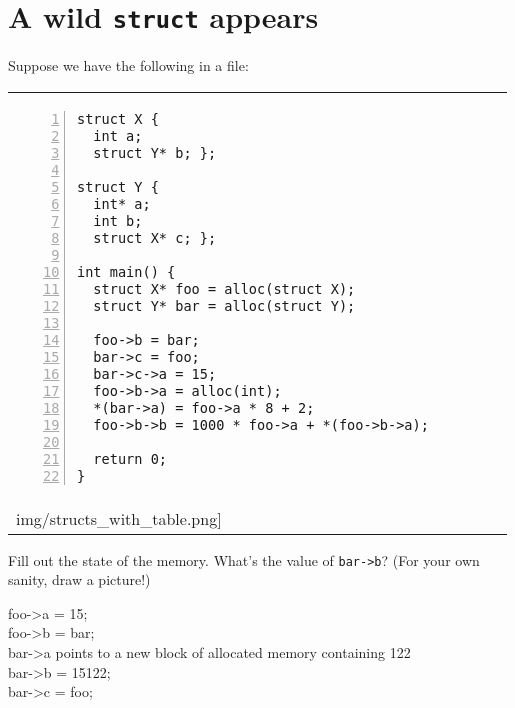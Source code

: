 \section*{A wild \lstinline'struct' appears%
}

Suppose we have the following in a file:

\begin{tabular}{l r}
    {\begin{lstlisting}[numbers=left]
struct X {
  int a;
  struct Y* b; };

struct Y {
  int* a;
  int b;
  struct X* c; };

int main() {
  struct X* foo = alloc(struct X);
  struct Y* bar = alloc(struct Y);

  foo->b = bar;
  bar->c = foo;
  bar->c->a = 15;
  foo->b->a = alloc(int);
  *(bar->a) = foo->a * 8 + 2;
  foo->b->b = 1000 * foo->a + *(foo->b->a);

  return 0;
}
    \end{lstlisting}}
& \raisebox{-30ex}{%
  \texttt{[image: \\img/structs\_with\_table.png]}}
\end{tabular}


Fill out the state of the memory.  What's the value of \lstinline'bar->b'?
(For your own sanity, draw a picture!)

\begin{solution}

  foo->a = 15; \\
  foo->b = bar;\\

  bar->a points to a new block of allocated memory containing 122\\
  bar->b = 15122;\\
  bar->c = foo;
\end{solution}
